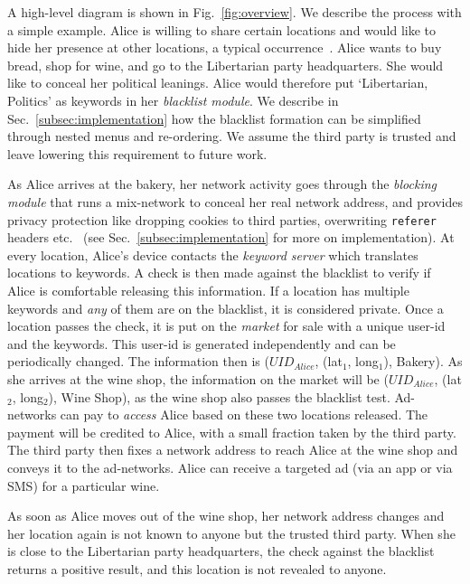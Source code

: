 A high-level diagram is shown in Fig.~\ref{fig:overview}. 
We describe the process with a simple example. 
Alice is willing to share certain locations and would like to hide her presence at other locations, a typical occurrence~\cite{Kelley:2011}. 
Alice wants to buy bread, shop for wine, and go to the Libertarian party headquarters. 
She would like to conceal her political leanings.
Alice would therefore put `Libertarian, Politics' as keywords in her \emph{blacklist module}. 
We describe in Sec.~\ref{subsec:implementation} how the blacklist formation can be simplified through nested menus and re-ordering. 
We assume the third party is trusted and leave lowering this requirement to future work.

As Alice arrives at the bakery, her network activity goes through the \emph{blocking module} that runs a mix-network to conceal her real network address, and provides privacy protection like dropping cookies to third parties, overwriting \texttt{referer} headers etc.~\cite{Krishnamurthy:2007io} (see Sec.~\ref{subsec:implementation} for more on implementation).
At every location, Alice's device contacts the \emph{keyword server} which translates locations to keywords.
A check is then made against the blacklist to verify if Alice is comfortable releasing this information. 
If a location has multiple keywords and \emph{any} of them are on the blacklist, it is considered private.
Once a location passes the check, it is put on the \emph{market} for sale with a unique user-id and the keywords. 
This user-id is generated independently and can be periodically changed. 
The information then is ($UID_{Alice}$, (lat$_1$, long$_1$), Bakery). 
As she arrives at the wine shop, the information on the market will be ($UID_{Alice}$, (lat$_2$, long$_2$), Wine Shop), as the wine shop also passes the blacklist test. 
Ad-networks can pay to \emph{access} Alice based on these two locations released. 
The payment will be credited to Alice, with a small fraction taken by the third party. 
The third party then fixes a network address to reach Alice at the wine shop and conveys it to the ad-networks. 
Alice can receive a targeted ad (via an app or via SMS) for a particular wine.

As soon as Alice moves out of the wine shop, her network address changes and her location again is not known
to anyone but the trusted third party. 
When she is close to the Libertarian party headquarters, the check against the blacklist
returns a positive result, and this location is not revealed to anyone. 

